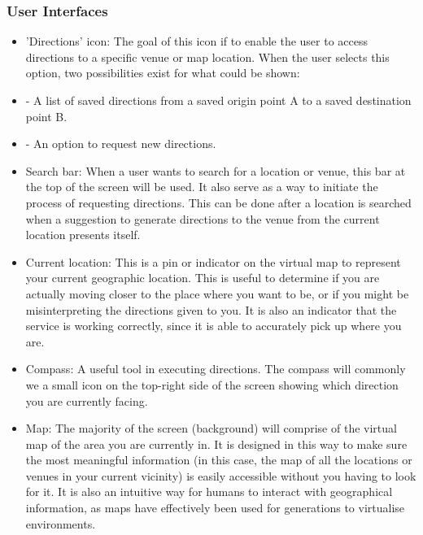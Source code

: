 \documentclass[runningheads,a4paper]{article}
\begin{document}
\subsubsection{User Interfaces}
\begin{itemize}

	\item 'Directions' icon: The goal of this icon if to enable the user to access directions to a specific venue or map location. When the user selects this option, two possibilities exist for what could be shown:
	
   	\item - A list of saved directions from a saved origin point A to a saved destination point B.
    	
   	\item - An option to request new directions.
	
	\item Search bar: When a user wants to search for a location or venue, this bar at the top of the screen will be used. It also serve as a way to initiate the process of requesting directions. This can be done after a location is searched when a suggestion to generate directions to the venue from the current location presents itself.
	
	\item Current location: This is a pin or indicator on the virtual map to represent your current geographic location. This is useful to determine if you are actually moving closer to the place where you want to be, or if you might be misinterpreting the directions given to you. It is also an indicator that the service is working correctly, since it is able to accurately pick up where you are.
	
	\item Compass: A useful tool in executing directions. The compass will commonly we a small icon on the top-right side of the screen showing which direction you are currently facing.
	
	\item Map: The majority of the screen (background) will comprise of the virtual map of the area you are currently in. It is designed in this way to make sure the most meaningful information (in this case, the map of all the locations or venues in your current vicinity) is easily accessible without you having to look for it. It is also an intuitive way for humans to interact with geographical information, as maps have effectively been used for generations to virtualise environments.
	

\end{itemize}
\end{document}
